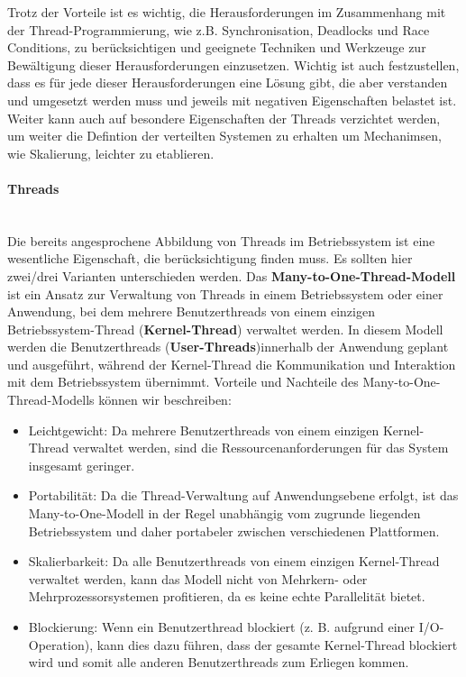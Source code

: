 \documentclass[../vs-script-first-v01.tex]{subfiles}
\begin{document}
Trotz der Vorteile ist es wichtig, die Herausforderungen im Zusammenhang mit der Thread-Programmierung, wie z.B. Synchronisation, Deadlocks und Race Conditions, zu berücksichtigen und geeignete Techniken und Werkzeuge zur Bewältigung dieser Herausforderungen einzusetzen. Wichtig ist auch festzustellen, dass es für jede dieser Herausforderungen eine Lösung gibt, die aber verstanden und umgesetzt werden muss und jeweils mit negativen Eigenschaften belastet ist. Weiter kann auch auf besondere Eigenschaften der Threads verzichtet werden, um weiter die Defintion der verteilten Systemen zu erhalten um Mechanimsen, wie Skalierung, leichter zu etablieren.
\paragraph{Threads}\mbox{}\\
Die bereits angesprochene Abbildung von Threads im Betriebssystem ist eine wesentliche Eigenschaft, die berücksichtigung finden muss. Es sollten hier zwei/drei Varianten unterschieden werden. Das \textbf{Many-to-One-Thread-Modell} ist ein Ansatz zur Verwaltung von Threads in einem Betriebssystem oder einer Anwendung, bei dem mehrere Benutzerthreads von einem einzigen Betriebssystem-Thread (\textbf{Kernel-Thread}) verwaltet werden. In diesem Modell werden die Benutzerthreads (\textbf{User-Threads})innerhalb der Anwendung geplant und ausgeführt, während der Kernel-Thread die Kommunikation und Interaktion mit dem Betriebssystem übernimmt. Vorteile und Nachteile des Many-to-One-Thread-Modells können wir beschreiben:
\begin{itemize}
\item Leichtgewicht: Da mehrere Benutzerthreads von einem einzigen Kernel-Thread verwaltet werden, sind die Ressourcenanforderungen für das System insgesamt geringer.
\item Portabilität: Da die Thread-Verwaltung auf Anwendungsebene erfolgt, ist das Many-to-One-Modell in der Regel unabhängig vom zugrunde liegenden Betriebssystem und daher portabeler zwischen verschiedenen Plattformen.
\item Skalierbarkeit: Da alle Benutzerthreads von einem einzigen Kernel-Thread verwaltet werden, kann das Modell nicht von Mehrkern- oder Mehrprozessorsystemen profitieren, da es keine echte Parallelität bietet.
\item Blockierung: Wenn ein Benutzerthread blockiert (z. B. aufgrund einer I/O-Operation), kann dies dazu führen, dass der gesamte Kernel-Thread blockiert wird und somit alle anderen Benutzerthreads zum Erliegen kommen.
\end{itemize}
\end{document}
